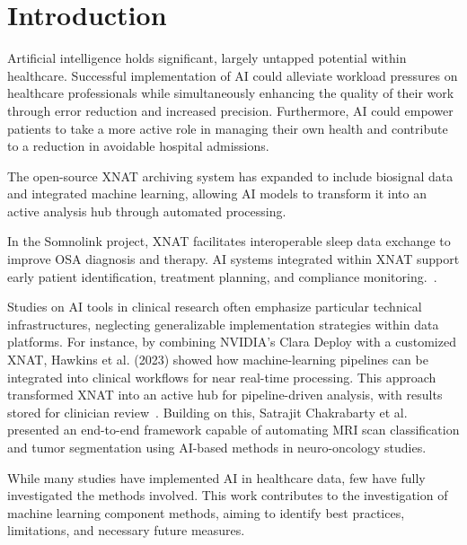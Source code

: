 

\chapter{Introduction}

Artificial intelligence holds significant, largely untapped potential within healthcare. Successful implementation of \ac{AI} could alleviate workload pressures on healthcare professionals while simultaneously enhancing the quality of their work through error reduction and increased precision. Furthermore, AI could empower patients to take a more active role in managing their own health and contribute to a reduction in avoidable hospital admissions.~\cite{aung_promise_2021}

The open-source XNAT archiving system has expanded to include biosignal data and integrated machine learning, allowing AI models to transform it into an active analysis hub through automated processing.~\cite{marcus_extensible_2007}

In the Somnolink project, XNAT facilitates interoperable sleep data exchange to improve \ac{OSA} diagnosis and therapy. AI systems integrated within XNAT support early patient identification, treatment planning, and compliance monitoring.~\cite{internetredaktion_somnolink_nodate}.

Studies on AI tools in clinical research often emphasize particular technical infrastructures, neglecting generalizable implementation strategies within data platforms. For instance, by combining NVIDIA’s Clara Deploy with a customized XNAT, Hawkins et al. (2023) showed how machine-learning pipelines can be integrated into clinical workflows for near real-time processing. This approach transformed XNAT into an active hub for pipeline-driven analysis, with results stored for clinician review~\cite{hawkins_implementation_2023}. Building on this, Satrajit Chakrabarty et al. ~\cite{chakrabarty_deep_2023} presented an end-to-end framework capable of automating MRI scan classification and tumor segmentation using AI-based methods in neuro-oncology studies.

While many studies have implemented AI in healthcare data, few have fully investigated the methods involved. This work contributes to the investigation of machine learning component methods, aiming to identify best practices, limitations, and necessary future measures.






 

